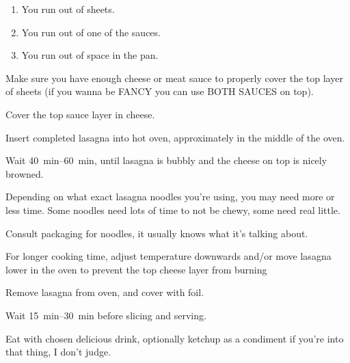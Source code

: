 \begin{recipe}
{		\begin{enumerate}
			\item You run out of sheets.

			\item You run out of one of the sauces.

			\item You run out of space in the pan.
		\end{enumerate}


		Make sure you have enough cheese or meat sauce to properly cover the top layer of sheets (if you wanna be FANCY you can use BOTH SAUCES on top).

		\step Cover the top sauce layer in cheese.

		\vspace{1em}

		\step Insert completed lasagna into hot oven, approximately in the middle of the oven.

		\step Wait \SIrange{40}{60}{\minute}, until lasagna is bubbly and the cheese on top is nicely browned.

		\vspace{1em}

		Depending on what exact lasagna noodles you’re using, you may need more or less time. Some noodles need lots of time to not be chewy, some need real little.

		Consult packaging for noodles, it usually knows what it’s talking about.

		For longer cooking time, adjust temperature downwards and/or move lasagna lower in the oven to prevent the top cheese layer from burning

		\step Remove lasagna from oven, and cover with foil.

		\vspace{1em}

		\step Wait \SIrange{15}{30}{\minute} before slicing and serving.

		\vspace{1em}

		\step Eat with chosen delicious drink, optionally ketchup as a condiment if you’re into that thing, I don’t judge.
	}


\end{recipe}